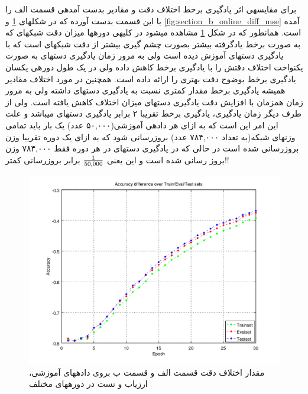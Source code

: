 \documentclass[10pt,a4paper]{article}
\newcommand{\نیمفاصله}{\halfspace}
\renewcommand{\ }{\halfspace}
\newcommand{\بپ}{انتشار-به-عقب }
\newcommand{\منست}{\lr{MNIST} }
\newcommand{\مسی}{\lr{MSE} }
\newcommand{\فوتنت}[1]{\footnote{\lr{#1}}}
\begin{document}
برای مقایسه\ ی اثر یادگیری برخط اختلاف دقت و مقادیر \مسی بدست آمده\ ی قسمت الف را با این قسمت بدست آورده که در شکل\ های
\ref{fig:section_b_online_diff_acc} و \ref{fig:section_b_online_diff_mse}
آمده است. همان\ طور که در شکل
\ref{fig:section_b_online_diff_acc}
مشاهده می\ شود در کلیه\ ی دوره\ ها میزان دقت شبکه\ ای که به صورت برخط یادگرفته بیشتر بصورت چشم گیری بیشتر از دقت شبکه\ ای است که با یادگیری دسته\ ای آموزش دیده است ولی به مرور زمان یادگیری دسته\ ای به صورت یکنواخت اختلاف دقتش را با یادگیری برخط کاهش داده ولی در یک طول دوره\ ی یکسان یادگیری برخط بوضوح دقت بهتری را ارائه داده است. همچنین در مورد اختلاف مقادیر \مسی همیشه یادگیری برخط مقدار \مسی کمتری نسبت به یادگیری دسته\ ای داشته ولی به مرور زمان همزمان با افزایش دقت یادگیری دسته\ ای میزان اختلاف \مسی کاهش یافته است.
ولی از طرف دیگر زمان یادگیری، یادگیری برخط تقریبا ۲ برابر یادگیری دسته\ ای می\ باشد و علت این امر این است که به ازای هر داده\ ی آموزشی(۵۰,۰۰۰ عدد) یک بار باید تمامی وزن\ های شبکه(به تعداد ۷۸۴,۰۰۰ عدد) بروزرسانی شود که به ازای یک دوره تقریبا
وزن بروزرسانی شده است در حالی که در یادگیری دسته\ ای در هر دوره فقط ۷۸۴,۰۰۰ وزن بروز رسانی شده است و این یعنی
$1 \over 50,000$
برابر بروزرسانی کمتر!!
\newpage
\begin{figure}[h!]
\centering
\includegraphics[width=.9\textwidth]{2_online_diff_acc}
\caption{مقدار اختلاف دقت قسمت الف و قسمت ب بروی داده\ های آموزشی، ارزیاب و تست در دوره\ های مختلف}\label{fig:section_b_online_diff_acc}
\end{figure}
\end{document}
